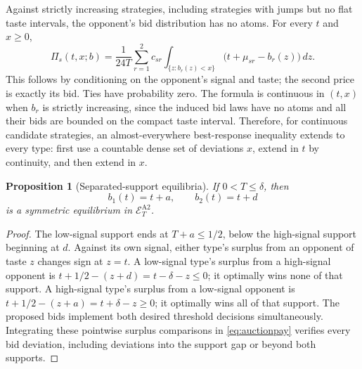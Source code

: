 \documentclass[11pt,a4paper]{article}
\newtheorem{proposition}[theorem]{Proposition}
\theoremstyle{remark}\newtheorem{remark}[theorem]{Remark}
\begin{document}
Against strictly increasing strategies, including strategies with jumps but no flat taste intervals, the opponent's bid distribution has no atoms. For every $t$ and $x\ge0$,
\begin{equation}\label{eq:auctionpay}
 \Pi_s(t,x;b)=\frac1{24T}\sum_{r=1}^2 c_{sr}
   \int_{\{z:b_r(z)<x\}}\bigl(t+\mu_{sr}-b_r(z)\bigr)\,dz.
\end{equation}
This follows by conditioning on the opponent's signal and taste; the second price is exactly its bid. Ties have probability zero. The formula is continuous in $(t,x)$ when $b_r$ is strictly increasing, since the induced bid laws have no atoms and all their bids are bounded on the compact taste interval. Therefore, for continuous candidate strategies, an almost-everywhere best-response inequality extends to every type: first use a countable dense set of deviations $x$, extend in $t$ by continuity, and then extend in $x$.

\begin{proposition}[Separated-support equilibria]\label{prop:separated}
If $0<T\le\delta$, then
\[
 b_1(t)=t+a,\qquad b_2(t)=t+d
\]
is a symmetric equilibrium in $\mathcal E_T^{\mathrm{A2}}$.
\end{proposition}
\begin{proof}
The low-signal support ends at $T+a\le1/2$, below the high-signal support beginning at $d$. Against its own signal, either type's surplus from an opponent of taste $z$ changes sign at $z=t$. A low-signal type's surplus from a high-signal opponent is
$t+1/2-(z+d)=t-\delta-z\le0$; it optimally wins none of that support. A high-signal type's surplus from a low-signal opponent is
$t+1/2-(z+a)=t+\delta-z\ge0$; it optimally wins all of that support. The proposed bids implement both desired threshold decisions simultaneously. Integrating these pointwise surplus comparisons in \eqref{eq:auctionpay} verifies every bid deviation, including deviations into the support gap or beyond both supports.
\end{proof}
\end{document}
